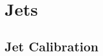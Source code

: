 \section{Jets}
\label{sec:ATLAS:jets}

\subsection{Jet Calibration}
\label{sec:ATLAS:jet_calibration}
